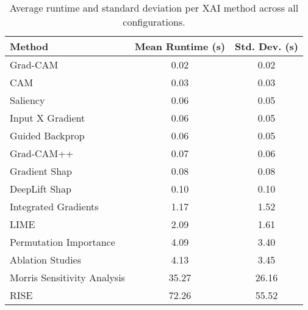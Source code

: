 \begin{table}[ht]
\centering
\begin{tabular}{lcc}
\toprule
Method & Mean Runtime (s) & Std. Dev. (s) \\
\midrule
Grad-CAM & 0.02 & 0.02 \\
CAM & 0.03 & 0.03 \\
Saliency & 0.06 & 0.05 \\
Input X Gradient & 0.06 & 0.05 \\
Guided Backprop & 0.06 & 0.05 \\
Grad-CAM++ & 0.07 & 0.06 \\
Gradient Shap & 0.08 & 0.08 \\
DeepLift Shap & 0.10 & 0.10 \\
Integrated Gradients & 1.17 & 1.52 \\
LIME & 2.09 & 1.61 \\
Permutation Importance & 4.09 & 3.40 \\
Ablation Studies & 4.13 & 3.45 \\
Morris Sensitivity Analysis & 35.27 & 26.16 \\
RISE & 72.26 & 55.52 \\
\bottomrule
\end{tabular}
\caption{Average runtime and standard deviation per XAI method across all configurations.}
\label{tab:runtime_all_balanced}
\end{table}
